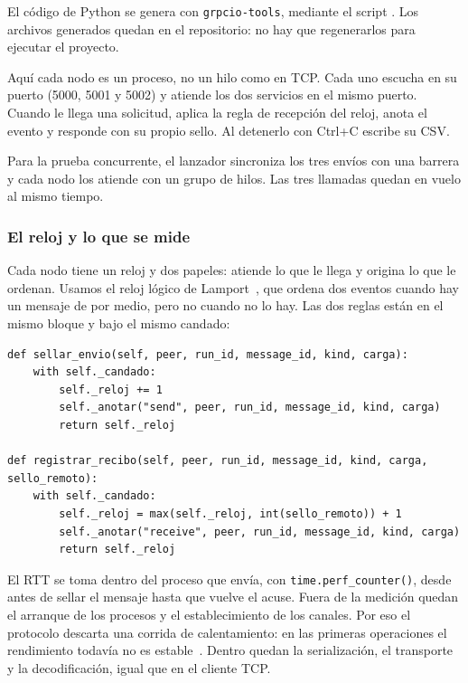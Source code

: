 El código de Python se genera con \texttt{grpcio-tools}, mediante el script
. Los archivos generados quedan en el repositorio:
no hay que regenerarlos para ejecutar el proyecto.

Aquí cada nodo es un proceso, no un hilo como en TCP. Cada uno escucha en su
puerto (5000, 5001 y 5002) y atiende los dos servicios en el mismo puerto. Cuando
le llega una solicitud, aplica la regla de recepción del reloj, anota el evento y
responde con su propio sello. Al detenerlo con Ctrl+C escribe su CSV.

Para la prueba concurrente, el lanzador sincroniza los tres envíos con una
barrera y cada nodo los atiende con un grupo de hilos. Las tres llamadas quedan en
vuelo al mismo tiempo.

\subsubsection{El reloj y lo que se mide}

Cada nodo tiene un reloj y dos papeles: atiende lo que le llega y origina lo que
le ordenan. Usamos el reloj lógico de Lamport~\cite{lamport1978}, que ordena
dos eventos cuando hay un mensaje de por medio, pero no cuando no lo hay. Las dos
reglas están en el mismo bloque y bajo el mismo candado:

{\small
\begin{verbatim}
def sellar_envio(self, peer, run_id, message_id, kind, carga):
    with self._candado:
        self._reloj += 1
        self._anotar("send", peer, run_id, message_id, kind, carga)
        return self._reloj

def registrar_recibo(self, peer, run_id, message_id, kind, carga, sello_remoto):
    with self._candado:
        self._reloj = max(self._reloj, int(sello_remoto)) + 1
        self._anotar("receive", peer, run_id, message_id, kind, carga)
        return self._reloj
\end{verbatim}
}

El RTT se toma dentro del proceso que envía, con \texttt{time.perf\_counter()},
desde antes de sellar el mensaje hasta que vuelve el acuse. Fuera de la medición
quedan el arranque de los procesos y el establecimiento de los canales. Por eso el
protocolo descarta una corrida de calentamiento: en las primeras operaciones el
rendimiento todavía no es estable~\cite{traini2023steady}. Dentro quedan la
serialización, el transporte y la decodificación, igual que en el cliente TCP.

